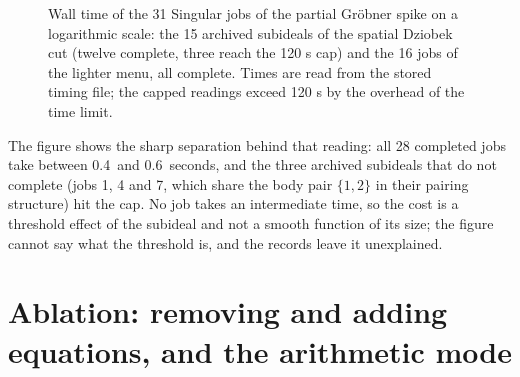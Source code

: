\documentclass[11pt]{article}
\theoremstyle{definition}
\theoremstyle{remark}
\newcommand{\numSingMin}{0.4}
\newcommand{\numSingMax}{0.6}
\begin{document}
\begin{figure}[t]\centering
{}
\caption{Wall time of the 31 Singular jobs of the partial Gr\"obner spike on a logarithmic scale: the 15 archived
subideals of the spatial Dziobek cut (twelve complete, three reach the 120 s cap) and the 16 jobs of the lighter
menu, all complete. Times are read from the stored timing file; the capped readings exceed 120 s by the
overhead of the time limit.}\label{fig:singular}
\end{figure}

The figure shows the sharp separation behind that reading: all 28 completed jobs take between \numSingMin\ and \numSingMax\
seconds, and the three archived subideals that do not complete (jobs 1, 4 and 7, which share the body pair $\{1,2\}$
in their pairing structure) hit the cap. No job takes an intermediate time, so the cost is a threshold effect of the
subideal and not a smooth function of its size; the figure cannot say what the threshold is, and the records leave it unexplained.

\section{Ablation: removing and adding equations, and the arithmetic mode}\label{sec:ablation}
\end{document}
